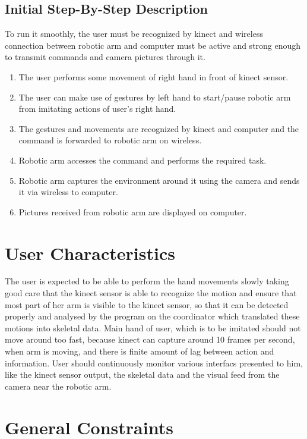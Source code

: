 \documentclass[a4wide]{scrreprt}
\begin{document}
\subsection{Initial Step-By-Step Description}

To run it smoothly, the user must be recognized by kinect and wireless connection between robotic arm and computer must be active and strong enough to transmit commands and camera pictures through it.

\begin{enumerate}
\item The user performs some movement of right hand in front of kinect sensor.
\item The user can make use of gestures by left hand to start/pause robotic arm from imitating actions of user's right hand.
\item The gestures and movements are recognized by kinect and computer and the command is forwarded to robotic arm on wireless.
\item Robotic arm accesses the command and performs the required task.
\item Robotic arm captures the environment around it using the camera and sends it via wireless to computer.
\item Pictures received from robotic arm are displayed on computer.
\end{enumerate}


\section{User Characteristics}

The user is expected to be able to perform the hand movements slowly taking good care that the kinect sensor is able to recognize the motion and ensure that most part of her arm is visible to the kinect sensor, so that it can be detected properly and analysed by the program on the coordinator which translated these motions into skeletal data. Main hand of user, which is to be imitated should not move around too fast, because kinect can capture around 10 frames per second, when arm is moving, and there is finite amount of lag between action and information. User should continuously monitor various interfacs presented to him, like the kinect sensor output, the skeletal data and the visual feed from the camera near the robotic arm.
\section{General Constraints}
\end{document}
